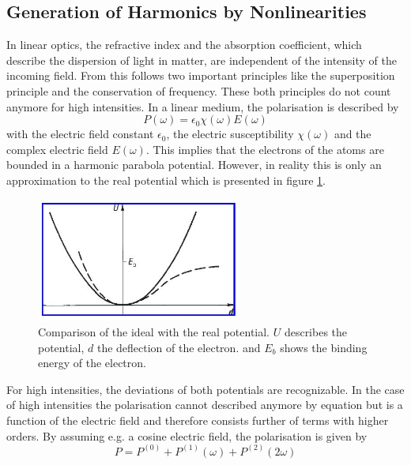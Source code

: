 \documentclass[10pt, a4paper, notitlepage, DIV=15]{scrartcl}
\begin{document}
\subsection{Generation of Harmonics by Nonlinearities}
In linear optics, the refractive index and the absorption coefficient, which describe the dispersion of light in matter, are independent of the intensity of the incoming field. From this follows two important principles like the superposition principle and the conservation of frequency. These both principles do not count anymore for high intensities. \newline
In a linear medium, the polarisation is described by
\begin{equation} \label{polarisation_linear}
P(\omega)=\epsilon_0 \chi(\omega)E(\omega)
\end{equation}
with the electric field constant $\epsilon_0$, the electric susceptibility $\chi(\omega)$ and the complex electric field $E(\omega)$. This implies that the electrons of the atoms are bounded in a harmonic parabola potential. However, in reality this is only an approximation to the real potential which is presented in figure \ref{fig:potential}.
\begin{figure}[h]
	\centering
	\includegraphics[width=0.6\textwidth]{potential}
	\caption{Comparison of the ideal with the real potential. $U$ describes the potential, $d$ the deflection of the electron. and $E_b$ shows the binding energy of the electron.   \cite{bergmann}}
	\label{fig:potential}
\end{figure}
\newline
For high intensities, the deviations of both potentials are recognizable. In the case of high intensities the polarisation cannot described anymore by equation but is a function of the electric field and therefore consists further of terms with higher orders. By assuming e.g. a cosine electric field, the polarisation is given by
\begin{equation}
P=P^{(0)}+P^{(1)}(\omega)+P^{(2)}(2\omega)
\end{equation}
\end{document}
